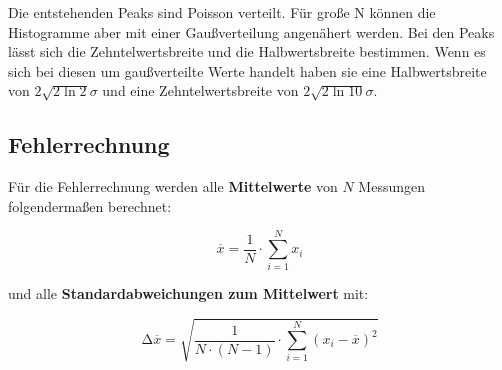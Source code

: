 Die entstehenden Peaks sind Poisson verteilt. Für große N können die
Histogramme aber mit einer Gaußverteilung angenähert werden. Bei den Peaks
lässt sich die Zehntelwertsbreite und die Halbwertsbreite bestimmen. Wenn es
sich bei diesen um gaußverteilte Werte handelt haben sie eine Halbwertsbreite
von $2\sqrt{2\ln 2} \sigma$ und eine Zehntelwertsbreite von $2 \sqrt{2\ln
		10}\sigma$.



\newpage
\subsection{Fehlerrechnung}
Für die Fehlerrechnung werden alle \textbf{Mittelwerte} von $N$ Messungen
folgendermaßen berechnet:

\begin{equation}
	\overline{x} = \frac{1}{N} \cdot \sum_{i=1}^N x_i
	\label{eqn:Mittelwert}
\end{equation}

und alle \textbf{Standardabweichungen zum Mittelwert} mit:

\begin{equation}
	\increment\overline{x} = \sqrt{\frac{1}{N\cdot(N-1)}\cdot\sum_{i=1}^N (x_i-\overline{x})^2}
	\label{eqn:St_Mittelwert}
\end{equation}

